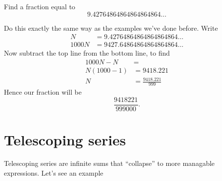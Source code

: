 \documentclass{ximera}
\begin{document}
\begin{example}
  Find a fraction equal to
  \[
  9.42764864864864864864\dots
  \]
  \begin{explanation}
    Do this exactly the same way as the examples we've done
    before. Write
    \begin{align*}
    N &=         9.42764864864864864864\dots\\
    1000 N &= 9427.64864864864864864\dots
    \end{align*}
    Now subtract the top line from the bottom line, to find
    \begin{align*}
      1000N - N &= \\
      N(1000-1) &= 9418.221\\
      N &= \frac{9418.221}{999}
    \end{align*}
    Hence our fraction will be
    \[
    \frac{9418221}{999000}.
    \]
  \end{explanation}
\end{example}



\section{Telescoping series}

Telescoping series are infinite sums that ``collapse'' to more
managable expressions.  Let's see an example
\end{document}
